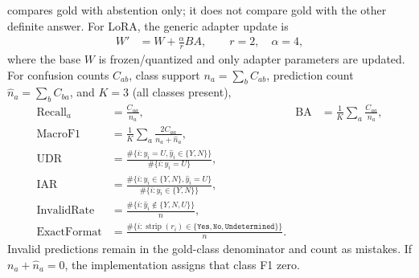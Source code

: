 compares gold with abstention only; it does not compare gold with the other definite answer.
For LoRA, the generic adapter update is
\begin{align}
W'&=W+\frac\alpha r BA,\qquad r=2,\quad\alpha=4,
\end{align}
where the base $W$ is frozen/quantized and only adapter parameters are updated.
For confusion counts $C_{ab}$, class support $n_a=\sum_bC_{ab}$, prediction count
$\widehat n_a=\sum_bC_{ba}$, and $K=3$ (all classes present),
\begin{align}
\operatorname{Recall}_a&=\frac{C_{aa}}{n_a},&
\operatorname{BA}&=\frac1K\sum_a\frac{C_{aa}}{n_a},\\
\operatorname{MacroF1}&=\frac1K\sum_a\frac{2C_{aa}}{n_a+\widehat n_a},\\
\operatorname{UDR}&=\frac{\#\{i:y_i=U,\widehat y_i\in\{Y,N\}\}}{\#\{i:y_i=U\}},\\
\operatorname{IAR}&=\frac{\#\{i:y_i\in\{Y,N\},\widehat y_i=U\}}{\#\{i:y_i\in\{Y,N\}\}},\\
\operatorname{InvalidRate}&=\frac{\#\{i:\widehat y_i\notin\{Y,N,U\}\}}n,\\
\operatorname{ExactFormat}&=\frac{\#\{i:\operatorname{strip}(r_i)\in\{\texttt{Yes},\texttt{No},\texttt{Undetermined}\}\}}n.
\end{align}
Invalid predictions remain in the gold-class denominator and count as mistakes.
If $n_a+\widehat n_a=0$, the implementation assigns that class F1 zero.
